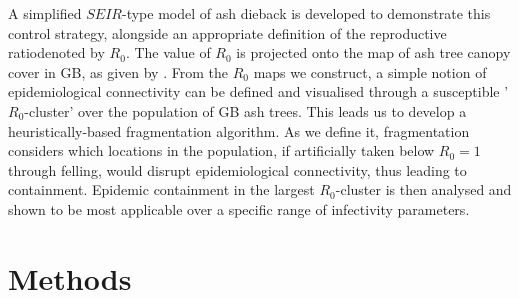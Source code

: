 A simplified $SEIR$-type model of ash dieback is developed to demonstrate this control strategy, alongside an appropriate definition of the reproductive ratio\textemdash denoted by $R_0$.  The value of $R_0$ is projected onto the map of ash tree canopy cover in GB, as given by \cite{hill.data}. From the $R_0$ maps we construct, a simple notion of epidemiological connectivity can be defined and visualised through a susceptible '$R_0$-cluster' over the population of GB ash trees. This leads us to develop a heuristically-based fragmentation algorithm. As we define it, fragmentation considers which locations in the population, if artificially taken below $R_0 = 1$ through felling, would disrupt epidemiological connectivity\textemdash, thus leading to containment. Epidemic containment in the largest $R_0$-cluster is then analysed and shown to be most applicable over a specific range of infectivity parameters.


\section{Methods}

